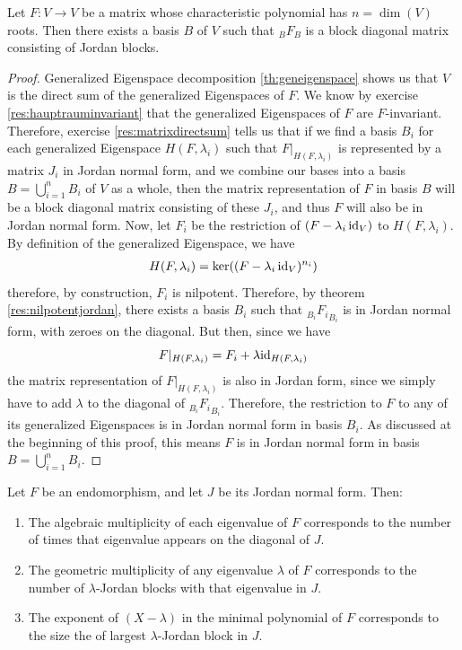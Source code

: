 \begin{corollary}
	Let $F : V \to V$ be a matrix whose characteristic polynomial has $n = \dim(V)$ roots. Then there exists a basis $B$ of $V$ such that $_BF_B$ is a block diagonal matrix consisting of Jordan blocks.
\end{corollary}
\begin{proof}
	Generalized Eigenspace decomposition \ref{th:geneigenspace} shows us that $V$ is the direct sum of the generalized Eigenspaces of $F$.
	We know by exercise \ref{res:hauptrauminvariant} that the generalized Eigenspaces of $F$ are $F$-invariant. Therefore, exercise \ref{res:matrixdirectsum} tells us that if we find a basis $B_i$ for each generalized Eigenspace $H(F, \lambda_i)$ such that $F|_{H(F, \lambda_i)}$ is represented by a matrix $J_i$ in Jordan normal form, and we combine our bases into a basis $B = \bigcup_{i = 1}^n B_i$ of $V$ as a whole, then the matrix representation of $F$ in basis $B$ will be a block diagonal matrix consisting of these $J_i$, and thus $F$ will also be in Jordan normal form.
	\newpar
	Now, let $F_i$ be the restriction of $(F - \lambda_i \operatorname{id}_V)$ to $H(F, \lambda_i)$.
	By definition of the generalized Eigenspace, we have
	\begin{align*}
		H(F, \lambda_i) = \ker((F - \lambda_i \operatorname{id}_V)^{n_i})
	\end{align*}
	therefore, by construction, $F_i$ is nilpotent. Therefore, by theorem \ref{res:nilpotentjordan}, there exists a basis $B_i$ such that $_{B_i}{F_i}_{B_i}$ is in Jordan normal form, with zeroes on the diagonal. But then, since we have $$F|_{H(F, \lambda_i)} = F_i + \lambda{\operatorname{id}_{H(F, \lambda_i)}}$$
	the matrix representation of $F|_{H(F, \lambda_i)}$ is also in Jordan form, since we simply have to add $\lambda$ to the diagonal of $_{B_i}{F_i}_{B_i}$.
	\newpar
	Therefore, the restriction to $F$ to any of its generalized Eigenspaces is in Jordan normal form in basis $B_i$. As discussed at the beginning of this proof, this means $F$ is in Jordan normal form in basis $B = \bigcup_{i = 1}^n B_i$.
\end{proof}
\begin{exercise}
	Let $F$ be an endomorphism, and let $J$ be its Jordan normal form. Then:
	\begin{enumerate}
		\item The algebraic multiplicity of each eigenvalue of $F$ corresponds to the number of times that eigenvalue appears on the diagonal of $J$.
		\item The geometric multiplicity of any eigenvalue $\lambda$ of $F$ corresponds to the number of $\lambda$-Jordan blocks with that eigenvalue in $J$.
		\item The exponent of $(X-\lambda)$ in the minimal polynomial of $F$ corresponds to the size the of largest $\lambda$-Jordan block in $J$.
	\end{enumerate}
\end{exercise}
